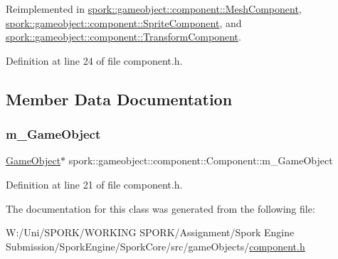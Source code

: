 Reimplemented in \hyperlink{classspork_1_1gameobject_1_1component_1_1_mesh_component_ac415c0ccc8938827b3f450c15a79d1b0}{spork\+::gameobject\+::component\+::\+Mesh\+Component}, \hyperlink{classspork_1_1gameobject_1_1component_1_1_sprite_component_a3c3b5324ab563b6e759e07fd7e11b96c}{spork\+::gameobject\+::component\+::\+Sprite\+Component}, and \hyperlink{classspork_1_1gameobject_1_1component_1_1_transform_component_a36194e25608601dbf7c6def7f988ecc1}{spork\+::gameobject\+::component\+::\+Transform\+Component}.



Definition at line 24 of file component.\+h.



\subsection{Member Data Documentation}
\mbox{\label{classspork_1_1gameobject_1_1component_1_1_component_a54dec04fa629b64bd5fb2191b2ad8a7e}} 
\subsubsection{\texorpdfstring{m\+\_\+\+Game\+Object}{m\_GameObject}}
{\footnotesize\ttfamily \hyperlink{classspork_1_1gameobject_1_1_game_object}{Game\+Object}$\ast$ spork\+::gameobject\+::component\+::\+Component\+::m\+\_\+\+Game\+Object\hspace{0.3cm}{\ttfamily [protected]}}



Definition at line 21 of file component.\+h.



The documentation for this class was generated from the following file\+:\begin{DoxyCompactItemize}
\item 
W\+:/\+Uni/\+S\+P\+O\+R\+K/\+W\+O\+R\+K\+I\+N\+G S\+P\+O\+R\+K/\+Assignment/\+Spork Engine Submission/\+Spork\+Engine/\+Spork\+Core/src/game\+Objects/\hyperlink{component_8h}{component.\+h}\end{DoxyCompactItemize}
